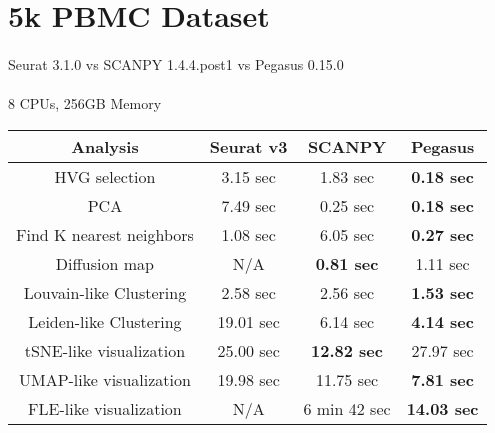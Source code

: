 \documentclass[10pt]{article}
\begin{document}
\section{5k PBMC Dataset}

\paragraph{}
Seurat 3.1.0 \qquad vs \qquad SCANPY 1.4.4.post1 \qquad vs \qquad Pegasus 0.15.0

\paragraph{}
8 CPUs, 256GB Memory

\begin{table}[H]
	\centering
	\begin{tabular}{|c|c|c|c|}
		\hline
		Analysis & Seurat v3 & SCANPY & Pegasus\\
		\hline \hline
		HVG selection & 3.15 sec & 1.83 sec & \textbf{0.18 sec}  \\
		\hline
		PCA & 7.49 sec & 0.25 sec & \textbf{0.18 sec}  \\
		\hline
		Find K nearest neighbors & 1.08 sec & 6.05 sec & \textbf{0.27 sec} \\
		\hline
		Diffusion map & N/A & \textbf{0.81 sec} & 1.11 sec  \\
		\hline
		Louvain-like Clustering & 2.58 sec & 2.56 sec & \textbf{1.53 sec} \\
		\hline 
		Leiden-like Clustering & 19.01 sec & 6.14 sec & \textbf{4.14 sec} \\
		\hline
		tSNE-like visualization & 25.00 sec & \textbf{12.82 sec }& 27.97 sec  \\
		\hline
		UMAP-like visualization & 19.98 sec & 11.75 sec & \textbf{7.81 sec} \\
		\hline
		FLE-like visualization & N/A & 6 min 42 sec & \textbf{14.03 sec} \\
		\hline
	\end{tabular}
\end{table}
\end{document}
